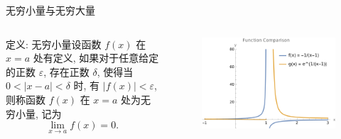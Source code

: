\documentclass[
10pt,  
aspectratio=43,  
]{beamer}
\begin{document}
\begin{frame}[c]{无穷小量与无穷大量}
		
	\begin{columns}[onlytextwidth]
		\begin{block}{定义: 无穷小量}设函数 $f(x)$ 在 $x=a$ 处有定义,  如果对于任意给定的正数 $\varepsilon$,  存在正数 $\delta$,  使得当 $0 < |x-a| < \delta$ 时,  有 $|f(x)| < \varepsilon$,  则称函数 $f(x)$ 在 $x=a$ 处为无穷小量,  记为
			\begin{equation*}
				\lim_{x\to a}f(x) = 0.
			\end{equation*}
		\end{block}
		
		\begin{figure}
			\centering
			\includegraphics[width=0.8\linewidth]{infinity2.png}
			
		\end{figure}
	\end{columns}
\end{frame}	
\end{document}
